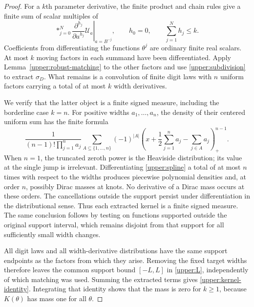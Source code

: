 \documentclass[11pt,letterpaper]{article}
\theoremstyle{definition}
\theoremstyle{remark}
\newcommand{\Un}{\mathcal U}
\begin{document}
\begin{proof}
For a $k$th parameter derivative, the finite product and chain rules give
a finite sum of scalar multiples of
\begin{equation}\label{upper:derivative-summand}
 \mathop{*}_{j=0}^{N}
 \left.
 \frac{\partial^{h_j}}{\partial a^{h_j}}\Un_a
 \right|_{a=B^{-j}},
 \qquad h_0=0,
 \qquad \sum_{j=1}^{N}h_j\le k.
\end{equation}
Coefficients from differentiating the functions $\theta^j$ are ordinary
finite real scalars.  At most $k$ moving factors in each summand have been
differentiated.  Apply Lemma~\ref{upper:robust-matching} to the other
factors and use \eqref{upper:subdivision} to extract $\sigma_D$.
What remains is a convolution of finite digit laws with $n$ uniform
factors carrying a total of at most $k$ width derivatives.

We verify that the latter object is a finite signed measure, including the
borderline case $k=n$.  For positive widths $a_1,\ldots,a_n$, the density
of their centered uniform sum has the finite formula
\begin{equation}\label{upper:spline}
 \frac1{(n-1)!\prod_{j=1}^n a_j}
 \sum_{A\subseteq\{1,\ldots,n\}}(-1)^{|A|}
 \left(x+\frac12\sum_{j=1}^n a_j-\sum_{j\in A}a_j\right)_+^{n-1}.
\end{equation}
When $n=1$, the truncated zeroth power is the Heaviside distribution; its
value at the single jump is irrelevant.  Differentiating
\eqref{upper:spline} a total of at most $n$ times with respect to the
widths produces piecewise polynomial densities and, at order $n$, possibly
Dirac masses at knots.  No derivative of a Dirac mass occurs at these
orders.  The cancellations outside the support persist under
differentiation in the distributional sense.  Thus each extracted kernel
is a finite signed measure.  The same conclusion follows by testing on
functions supported outside the original support interval, which remains
disjoint from that support for all sufficiently small width changes.

All digit laws and all width-derivative distributions have the same support
endpoints as the factors from which they arise.  Removing the fixed target
widths therefore leaves the common support bound $[-L,L]$ in
\eqref{upper:L}, independently of which matching was used.  Summing the
extracted terms gives \eqref{upper:kernel-identity}.  Integrating that
identity shows that the mass is zero for $k\ge1$, because $K(\theta)$ has
mass one for all $\theta$.


\end{proof}
\end{document}
